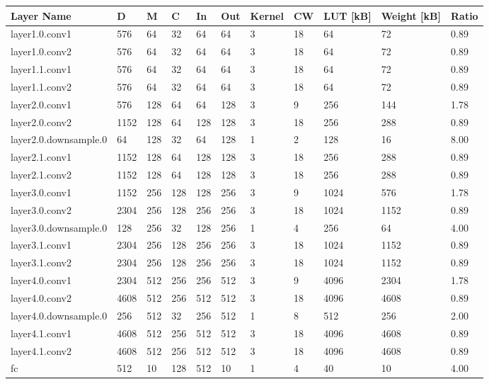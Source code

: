 \begin{table}
\centering
\begin{tabular}{lllllllllll}
\toprule
Layer Name & D & M & C & In & Out & Kernel & CW & LUT [kB] & Weight [kB] & Ratio \\
\midrule
layer1.0.conv1 & 576 & 64 & 32 & 64 & 64 & 3 & 18 & 64 & 72 & 0.89 \\
layer1.0.conv2 & 576 & 64 & 32 & 64 & 64 & 3 & 18 & 64 & 72 & 0.89 \\
layer1.1.conv1 & 576 & 64 & 32 & 64 & 64 & 3 & 18 & 64 & 72 & 0.89 \\
layer1.1.conv2 & 576 & 64 & 32 & 64 & 64 & 3 & 18 & 64 & 72 & 0.89 \\
layer2.0.conv1 & 576 & 128 & 64 & 64 & 128 & 3 & 9 & 256 & 144 & 1.78 \\
layer2.0.conv2 & 1152 & 128 & 64 & 128 & 128 & 3 & 18 & 256 & 288 & 0.89 \\
layer2.0.downsample.0 & 64 & 128 & 32 & 64 & 128 & 1 & 2 & 128 & 16 & 8.00 \\
layer2.1.conv1 & 1152 & 128 & 64 & 128 & 128 & 3 & 18 & 256 & 288 & 0.89 \\
layer2.1.conv2 & 1152 & 128 & 64 & 128 & 128 & 3 & 18 & 256 & 288 & 0.89 \\
layer3.0.conv1 & 1152 & 256 & 128 & 128 & 256 & 3 & 9 & 1024 & 576 & 1.78 \\
layer3.0.conv2 & 2304 & 256 & 128 & 256 & 256 & 3 & 18 & 1024 & 1152 & 0.89 \\
layer3.0.downsample.0 & 128 & 256 & 32 & 128 & 256 & 1 & 4 & 256 & 64 & 4.00 \\
layer3.1.conv1 & 2304 & 256 & 128 & 256 & 256 & 3 & 18 & 1024 & 1152 & 0.89 \\
layer3.1.conv2 & 2304 & 256 & 128 & 256 & 256 & 3 & 18 & 1024 & 1152 & 0.89 \\
layer4.0.conv1 & 2304 & 512 & 256 & 256 & 512 & 3 & 9 & 4096 & 2304 & 1.78 \\
layer4.0.conv2 & 4608 & 512 & 256 & 512 & 512 & 3 & 18 & 4096 & 4608 & 0.89 \\
layer4.0.downsample.0 & 256 & 512 & 32 & 256 & 512 & 1 & 8 & 512 & 256 & 2.00 \\
layer4.1.conv1 & 4608 & 512 & 256 & 512 & 512 & 3 & 18 & 4096 & 4608 & 0.89 \\
layer4.1.conv2 & 4608 & 512 & 256 & 512 & 512 & 3 & 18 & 4096 & 4608 & 0.89 \\
fc & 512 & 10 & 128 & 512 & 10 & 1 & 4 & 40 & 10 & 4.00 \\
\bottomrule
\end{tabular}
\end{table}
